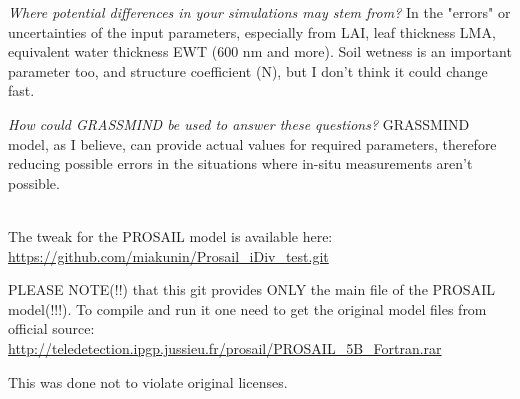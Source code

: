\documentclass[a4paper,12pt]{article}
\begin{document}
\textit{Where potential differences in your simulations may stem from?} 
In the "errors" or uncertainties of the input parameters, especially from LAI, leaf thickness LMA, equivalent water thickness EWT (600 nm and more). Soil wetness is an important parameter too, and structure coefficient (N), but I don't think it could change fast.

\textit{How could GRASSMIND be used to answer these questions?} 
GRASSMIND model, as I believe, can provide actual values for required parameters, therefore reducing possible errors in the situations where in-situ measurements aren't possible.

~ \\

The tweak for the PROSAIL model is available here:\\ \url{https://github.com/miakunin/Prosail_iDiv_test.git}

PLEASE NOTE(!!) that this git provides ONLY the main file of the PROSAIL model(!!!). To compile and run it one need to get the original model files from official source: \url{http://teledetection.ipgp.jussieu.fr/prosail/PROSAIL_5B_Fortran.rar}

This was done not to violate original licenses.
\end{document}
